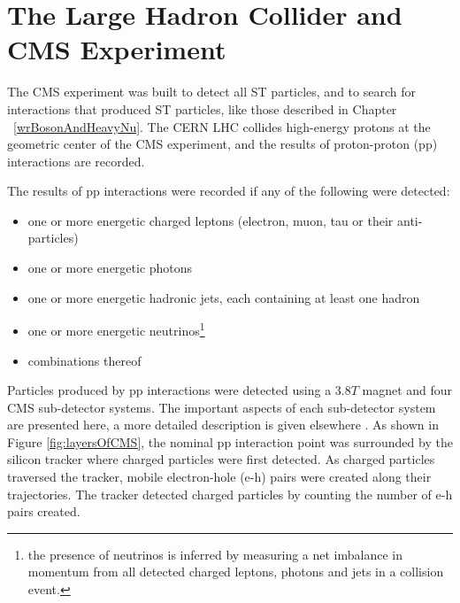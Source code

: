 \chapter{The Large Hadron Collider and CMS Experiment}
\label{sec:experiment_chapter}
The CMS experiment was built to detect all ST particles, and to
search for interactions that produced ST particles, like those described in Chapter ~\ref{wrBosonAndHeavyNu}.  The CERN LHC 
collides high-energy protons at the geometric center of the CMS experiment, and the results of proton-proton (pp) 
interactions are recorded.

The results of pp interactions were recorded if any of the following were detected:
\begin{itemize}
	\item one or more energetic charged leptons (electron, muon, tau or their anti-particles)
	\item one or more energetic photons
	\item one or more energetic hadronic jets, each containing at least one hadron
	\item one or more energetic neutrinos\footnote{the presence of neutrinos is inferred by measuring a net imbalance in 
		momentum from all detected charged leptons, photons and jets in a collision event.}
	\item combinations thereof
\end{itemize}
Particles produced by pp interactions were detected using a 3.8$\unit{T}$ magnet and four CMS 
sub-detector systems.  The important aspects of each sub-detector system are presented here, a more detailed 
description is given elsewhere \cite{cmsDetectorPaper}.  As shown in Figure \ref{fig:layersOfCMS}, the nominal pp interaction point 
was surrounded by the silicon tracker where charged particles were first detected.  As charged particles traversed
the tracker, mobile electron-hole (e-h) pairs were created along their trajectories.  The tracker detected 
charged particles by counting the number of e-h pairs created.

